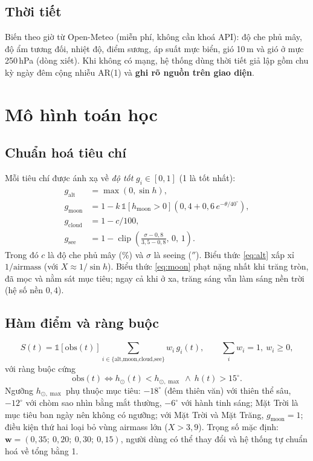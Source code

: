 \documentclass[12pt,a4paper]{article}
\newcommand{\ind}{\mathbb{1}}
\newcommand{\arcsec}{\ensuremath{''}}
\begin{document}
\subsection{Thời tiết}
Biến theo giờ từ Open-Meteo (miễn phí, không cần khoá API): độ che phủ mây, độ ẩm tương đối,
nhiệt độ, điểm sương, áp suất mực biển, gió 10\,m và gió ở mực 250\,hPa (dòng xiết).
Khi không có mạng, hệ thống dùng thời tiết giả lập gồm chu kỳ ngày đêm cộng nhiễu AR(1) và
\textbf{ghi rõ nguồn trên giao diện}.

\section{Mô hình toán học}

\subsection{Chuẩn hoá tiêu chí}
Mỗi tiêu chí được ánh xạ về \emph{độ tốt} $g_i\in[0,1]$ (1 là tốt nhất):
\begin{align}
g_{\text{alt}}  &= \max(0,\sin h), \label{eq:alt}\\
g_{\text{moon}} &= 1 - k\,\ind[h_{\text{moon}}>0]\left(0{,}4 + 0{,}6\,e^{-\theta/40^\circ}\right), \label{eq:moon}\\
g_{\text{cloud}} &= 1 - c/100, \label{eq:cloud}\\
g_{\text{see}}  &= 1 - \operatorname{clip}\!\left(\frac{\sigma-0{,}8}{3{,}5-0{,}8},\,0,\,1\right). \label{eq:see}
\end{align}
Trong đó $c$ là độ che phủ mây (\%) và $\sigma$ là seeing (\arcsec).
Biểu thức \eqref{eq:alt} xấp xỉ $1/\text{airmass}$ (với $X\approx 1/\sin h$).
Biểu thức \eqref{eq:moon} phạt nặng nhất khi trăng tròn, đã mọc và nằm sát mục tiêu; ngay cả khi
ở xa, trăng sáng vẫn làm sáng nền trời (hệ số nền $0{,}4$).

\subsection{Hàm điểm và ràng buộc}
\begin{equation}
S(t) = \ind[\text{obs}(t)]\sum_{i\in\{\text{alt,moon,cloud,see}\}} w_i\,g_i(t),
\qquad \sum_i w_i = 1,\ w_i\ge 0,
\end{equation}
với ràng buộc cứng
\begin{equation}
\text{obs}(t) \iff h_\odot(t) < h_{\odot,\max} \ \wedge\ h(t) > 15^\circ .
\end{equation}
Ngưỡng $h_{\odot,\max}$ phụ thuộc mục tiêu: $-18^\circ$ (đêm thiên văn) với thiên thể sâu,
$-12^\circ$ với chòm sao nhìn bằng mắt thường, $-6^\circ$ với hành tinh sáng; Mặt Trời là mục tiêu
ban ngày nên không có ngưỡng; với Mặt Trời và Mặt Trăng, $g_{\text{moon}}=1$; điều kiện thứ hai loại bỏ vùng airmass lớn ($X>3{,}9$).
Trọng số mặc định: $\bm{w} = (0{,}35;\ 0{,}20;\ 0{,}30;\ 0{,}15)$, người dùng có thể thay đổi
và hệ thống tự chuẩn hoá về tổng bằng 1.
\end{document}
